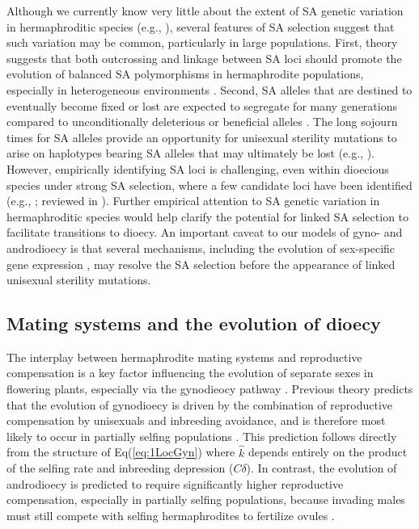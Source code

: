 \documentclass{article}
\newcommand\hl[1]{%
  \bgroup
  \hskip0pt\color{blue!80!black}%
  #1%
  \egroup
}
\begin{document}
\hl{Although we currently know very little about} the extent of SA genetic variation in hermaphroditic species (e.g., \citealt{Abbott2011,Olito-etal-2018}), several features of SA selection suggest that such variation may be common, particularly in large populations. First, theory suggests that both outcrossing and linkage between SA loci should promote the evolution of balanced SA polymorphisms in hermaphrodite populations, \hl{especially in heterogeneous environments} \citep{JordanConnallon2014, Olito2017, Olito-etal-2018}. Second, SA alleles that are destined to eventually become fixed or lost are expected to segregate for many generations \hl{compared to unconditionally deleterious or beneficial alleles \citep{ConnallonClark2012}. The long sojourn times for SA alleles provide an opportunity for unisexual sterility mutations to arise on haplotypes bearing SA alleles that may ultimately be lost (e.g., \citealt{WeinreichChao2005}). However, empirically identifying SA loci is challenging, even within dioecious species under strong SA selection, where a few candidate loci have been identified (e.g., \citealt{Barson2015, LeeKelly2015}; reviewed in \citealt{ConnallonHall2018, Mank2017}).} Further empirical attention to SA genetic variation in hermaphroditic species would help clarify the potential for linked SA selection to facilitate transitions to dioecy. \hl{An important caveat to our models of gyno- and androdioecy is that several mechanisms, including the evolution of sex-specific gene expression \citep{Vicoso2013}, may resolve the SA selection before the appearance of linked unisexual sterility mutations.}


\subsection*{Mating systems and the evolution of dioecy}

The interplay between hermaphrodite mating systems and reproductive compensation is a key factor influencing the evolution of separate sexes in flowering plants, especially via the gynodieocy pathway \citep{Darwin1877,Charlesworth1978a}. Previous theory predicts that the evolution of gynodioecy is driven by the combination of reproductive compensation by unisexuals and inbreeding avoidance, and is therefore most likely to occur in partially selfing populations \citep{Lewis1942, Lloyd1975, Charlesworth1978a, KaferPannell2017}. This prediction follows directly from the structure of Eq(\ref{eq:1LocGyn}) where $\hat{k}$ depends entirely on the product of the selfing rate and inbreeding depression ($C \delta$). In contrast, the evolution of androdioecy is predicted to require significantly higher reproductive compensation, especially in partially selfing populations, because invading males must still compete with selfing hermaphrodites to fertilize ovules \citep{Charlesworth1978b, KaferPannell2017}. 
\end{document}
